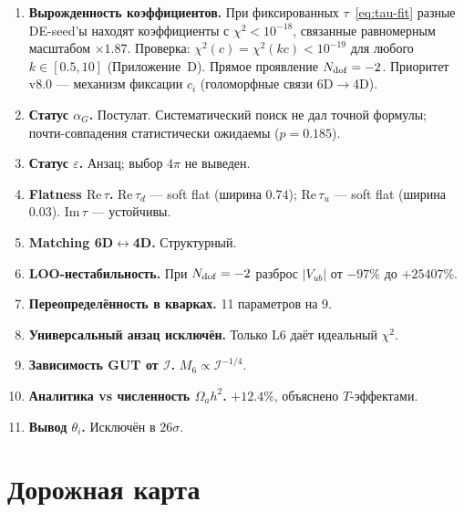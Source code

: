 \documentclass[12pt,a4paper]{article}
\numberwithin{equation}{section}
\begin{document}
\begin{enumerate}[leftmargin=1.5em]

\item \textbf{Вырожденность коэффициентов.} При фиксированных
      $\tau$~\eqref{eq:tau-fit} разные DE-seed'ы находят
      коэффициенты с $\chi^2 < 10^{-18}$, связанные
      равномерным масштабом $\times 1.87$. Проверка:
      $\chi^2(c) = \chi^2(kc) < 10^{-19}$ для любого $k \in [0.5, 10]$
      (Приложение~D). Прямое проявление $N_{\rm dof} = -2$.
      Приоритет v8.0 --- механизм фиксации $c_i$
      (голоморфные связи 6D$\to$4D).

\item \textbf{Статус $\alpha_G$.} Постулат. Систематический
      поиск не дал точной формулы; почти-совпадения
      статистически ожидаемы ($p = 0.185$).

\item \textbf{Статус $\varepsilon$.} Анзац; выбор $4\pi$ не выведен.

\item \textbf{Flatness $\mathrm{Re}\,\tau$.} $\mathrm{Re}\,\tau_d$ ---
      soft flat (ширина $0.74$); $\mathrm{Re}\,\tau_u$ ---
      soft flat (ширина $0.03$). $\mathrm{Im}\,\tau$ --- устойчивы.

\item \textbf{Matching 6D$\leftrightarrow$4D.} Структурный.

\item \textbf{LOO-нестабильность.} При $N_{\rm dof} = -2$
      разброс $|V_{ub}|$ от $-97\%$ до $+25407\%$.

\item \textbf{Переопределённость в кварках.} 11 параметров на 9.

\item \textbf{Универсальный анзац исключён.} Только L6 даёт
      идеальный $\chi^2$.

\item \textbf{Зависимость GUT от $\mathcal{I}$.}
      $M_6 \propto \mathcal{I}^{-1/4}$.

\item \textbf{Аналитика vs численность $\Omega_a h^2$.}
      $+12.4\%$, объяснено $T$-эффектами.

\item \textbf{Вывод $\theta_i$.} Исключён в $26\sigma$.
\end{enumerate}

\section{Дорожная карта}
\end{document}
